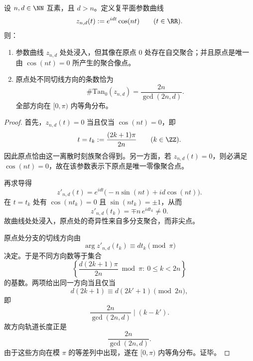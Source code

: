 \begin{proposition}[有理玫瑰在原点的唯一聚合奇异性与切锥方向数]\label{prop:xi-time-part62da-rational-rose-origin-tangent-cone}
设 \(n,d\in\NN\) 互素，且 \(d>n\)。定义复平面参数曲线
\[
z_{n,d}(t):=e^{idt}\cos(nt)
\qquad (t\in\RR).
\]
则：
\begin{enumerate}
  \item 参数曲线 \(z_{n,d}\) 处处浸入，但其像在原点 \(0\) 处存在自交聚合；并且原点是唯一由 \(\cos(nt)=0\) 所产生的聚合像点。
  \item 原点处不同切线方向的条数恰为
  \[
  \boxed{\;
  \#\mathrm{Tan}_0(z_{n,d})
  =
  \frac{2n}{\gcd(2n,d)}.\;}
  \]
  全部方向在 \([0,\pi)\) 内等角分布。
\end{enumerate}
\end{proposition}
\begin{proof}
首先，\(z_{n,d}(t)=0\) 当且仅当 \(\cos(nt)=0\)，即
\[
t=t_k:=\frac{(2k+1)\pi}{2n}
\qquad (k\in\ZZ).
\]
因此原点恰由这一离散时刻族聚合得到。另一方面，若 \(z_{n,d}(t)=0\)，则必满足 \(\cos(nt)=0\)，故在该参数表示下原点是唯一零像聚合点。

再求导得
\[
z'_{n,d}(t)
=
e^{idt}\bigl(-n\sin(nt)+id\cos(nt)\bigr).
\]
在 \(t=t_k\) 处有 \(\cos(nt_k)=0\) 且 \(\sin(nt_k)=\pm 1\)，从而
\[
z'_{n,d}(t_k)=\mp n\,e^{idt_k}\neq 0.
\]
故曲线处处浸入，原点处的奇异性来自多分支聚合，而非尖点。

原点处分支的切线方向由
\[
\arg z'_{n,d}(t_k)\equiv dt_k\pmod\pi
\]
决定。于是不同方向数等于集合
\[
\left\{\frac{d(2k+1)\pi}{2n}\bmod \pi:\ 0\le k<2n\right\}
\]
的基数。两项给出同一方向当且仅当
\[
d(2k+1)\equiv d(2k'+1)\pmod{2n},
\]
即
\[
\frac{2n}{\gcd(2n,d)}\mid (k-k').
\]
故方向轨道长度正是
\[
\frac{2n}{\gcd(2n,d)}.
\]
由于这些方向在模 \(\pi\) 的等差列中出现，遂在 \([0,\pi)\) 内等角分布。证毕。
\end{proof}


